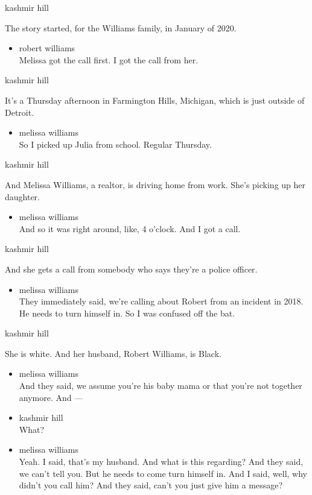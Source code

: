 kashmir hill

The story started, for the Williams family, in January of 2020.

\begin{itemize}
\tightlist
\item
  robert williams\\
  Melissa got the call first. I got the call from her.
\end{itemize}

kashmir hill

It's a Thursday afternoon in Farmington Hills, Michigan, which is just
outside of Detroit.

\begin{itemize}
\tightlist
\item
  melissa williams\\
  So I picked up Julia from school. Regular Thursday.
\end{itemize}

kashmir hill

And Melissa Williams, a realtor, is driving home from work. She's
picking up her daughter.

\begin{itemize}
\tightlist
\item
  melissa williams\\
  And so it was right around, like, 4 o'clock. And I got a call.
\end{itemize}

kashmir hill

And she gets a call from somebody who says they're a police officer.

\begin{itemize}
\tightlist
\item
  melissa williams\\
  They immediately said, we're calling about Robert from an incident in
  2018. He needs to turn himself in. So I was confused off the bat.
\end{itemize}

kashmir hill

She is white. And her husband, Robert Williams, is Black.

\begin{itemize}
\item
  melissa williams\\
  And they said, we assume you're his baby mama or that you're not
  together anymore. And ---
\item
  kashmir hill\\
  What?
\item
  melissa williams\\
  Yeah. I said, that's my husband. And what is this regarding? And they
  said, we can't tell you. But he needs to come turn himself in. And I
  said, well, why didn't you call him? And they said, can't you just
  give him a message?
\end{itemize}

